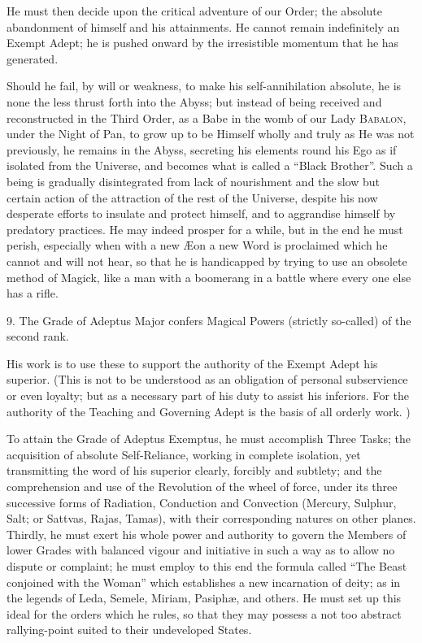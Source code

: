 He must then decide upon the critical adventure of our Order; the absolute abandonment of himself and his attainments. He cannot remain indefinitely an Exempt Adept; he is pushed onward by the irresistible momentum that he has generated.

Should he fail, by will or weakness, to make his self-annihilation absolute, he is none the less thrust forth into the Abyss; but instead of being received and reconstructed in the Third Order, as a Babe in the womb of our Lady \textsc{Babalon}, under the Night of Pan, to grow up to be Himself wholly and truly as He was not previously, he remains in the Abyss, secreting his elements round his Ego as if isolated from the Universe, and becomes what is called a \enquote{Black Brother}. Such a being is gradually disintegrated from lack of nourishment and the slow but certain action of the attraction of the rest of the Universe, despite his now desperate efforts to insulate and protect himself, and to aggrandise himself by predatory practices. He may indeed prosper for a while, but in the end he must perish, especially when with a new \AE{}on a new Word is proclaimed which he cannot and will not hear, so that he is handicapped by trying to use an obsolete method of Magick, like a man with a boomerang in a battle where every one else has a rifle.

\vspace{\baselineskip}

9. The Grade of Adeptus Major confers Magical Powers (strictly so-called) of the second rank.

His work is to use these to support the authority of the Exempt Adept his superior. (This is not to be understood as an obligation of personal subservience or even loyalty; but as a necessary part of his duty to assist his inferiors. For the authority of the Teaching and Governing Adept is the basis of all orderly work. )

To attain the Grade of Adeptus Exemptus, he must accomplish Three Tasks; the acquisition of absolute Self-Reliance, working in complete isolation, yet transmitting the word of his superior clearly, forcibly and subtlety; and the comprehension and use of the Revolution of the wheel of force, under its three successive forms of Radiation, Conduction and Convection (Mercury, Sulphur, Salt; or Sattvas, Rajas, Tamas), with their corresponding natures on other planes. Thirdly, he must exert his whole power and authority to govern the Members of lower Grades with balanced vigour  and initiative in such a way as to allow no dispute or complaint; he must employ to this end the formula called \enquote{The Beast conjoined with the Woman} which establishes a new incarnation of deity; as in the legends of Leda, Semele, Miriam, Pasiph\ae{}, and others. He must set up this ideal for the orders which he rules, so that they may possess a not too abstract rallying-point suited to their undeveloped States.

